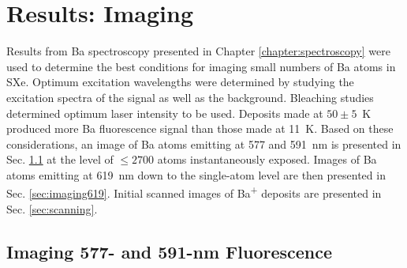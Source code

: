 \chapter{Results: Imaging}
\label{chapter:imaging}


Results from Ba spectroscopy presented in Chapter \ref{chapter:spectroscopy} were used to determine the best conditions for imaging small numbers of Ba atoms in SXe.  Optimum excitation wavelengths were determined by studying the excitation spectra of the signal as well as the background.  Bleaching studies determined optimum laser intensity to be used.  Deposits made at $50 \pm 5$~K produced more Ba fluorescence signal than those made at 11~K.  Based on these considerations, an image of Ba atoms emitting at 577 and 591~nm is presented in Sec. \ref{sec:imaging590and577} at the level of $\leq 2700$ atoms instantaneously exposed. Images of Ba atoms emitting at 619~nm down to the single-atom level are then presented in Sec. \ref{sec:imaging619}.  Initial scanned images of Ba\textsuperscript{+} deposits are presented in Sec. \ref{sec:scanning}.






\section{Imaging 577- and 591-nm Fluorescence}
\label{sec:imaging590and577}

